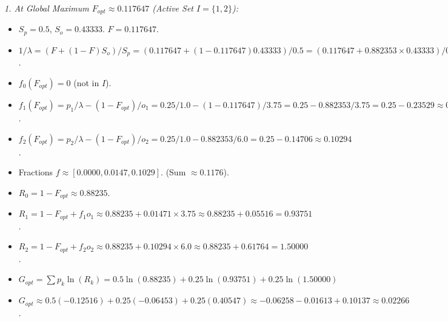 \documentclass[11pt, letterpaper]{article}
\theoremstyle{definition}
\begin{document}
\emph{1. At Global Maximum $F_{opt} \approx 0.117647$ (Active Set $I=\{1, 2\}$):}
\begin{itemize}
    \item $S_p=0.5$, $S_o=0.43333$. $F=0.117647$.
    \item $1/\lambda = (F + (1-F)S_o)/S_p = (0.117647 + (1-0.117647)0.43333)/0.5 = (0.117647 + 0.882353 \times 0.43333)/0.5 = (0.117647 + 0.38235)/0.5 = 0.5/0.5 = 1.0$.
    \item $f_0(F_{opt}) = 0$ (not in $I$).
    \item $f_1(F_{opt}) = p_1/\lambda - (1-F_{opt})/o_1 = 0.25/1.0 - (1-0.117647)/3.75 = 0.25 - 0.882353/3.75 = 0.25 - 0.23529 \approx 0.01471$.
    \item $f_2(F_{opt}) = p_2/\lambda - (1-F_{opt})/o_2 = 0.25/1.0 - 0.882353/6.0 = 0.25 - 0.14706 \approx 0.10294$.
    \item Fractions $f \approx [0.0000, 0.0147, 0.1029]$. (Sum $\approx 0.1176$).
    \item $R_0 = 1 - F_{opt} \approx 0.88235$.
    \item $R_1 = 1 - F_{opt} + f_1 o_1 \approx 0.88235 + 0.01471 \times 3.75 \approx 0.88235 + 0.05516 = 0.93751$.
    \item $R_2 = 1 - F_{opt} + f_2 o_2 \approx 0.88235 + 0.10294 \times 6.0 \approx 0.88235 + 0.61764 = 1.50000$.
    \item $G_{opt} = \sum p_k \ln(R_k) = 0.5 \ln(0.88235) + 0.25 \ln(0.93751) + 0.25 \ln(1.50000)$
    \item $G_{opt} \approx 0.5(-0.12516) + 0.25(-0.06453) + 0.25(0.40547) \approx -0.06258 - 0.01613 + 0.10137 \approx 0.02266$.
\end{itemize}
\end{document}
